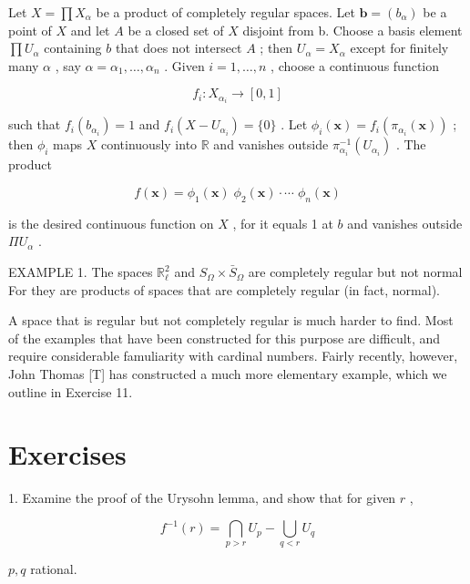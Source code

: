\documentclass[10pt]{article}
\begin{document}
Let \(X = \prod {X}_{\alpha }\) be a product of completely regular spaces. Let \(\mathbf{b} = \left( {b}_{\alpha }\right)\) be a point of \(X\) and let \(A\) be a closed set of \(X\) disjoint from b. Choose a basis element \(\prod {U}_{\alpha }\) containing \(b\) that does not intersect \(A\) ; then \({U}_{\alpha } = {X}_{\alpha }\) except for finitely many \(\alpha\) , say \(\alpha  = {\alpha }_{1},\ldots ,{\alpha }_{n}\) . Given \(i = 1,\ldots ,n\) , choose a continuous function

\[
{f}_{i} : {X}_{{\alpha }_{i}} \rightarrow  \left\lbrack  {0,1}\right\rbrack
\]

such that \({f}_{i}\left( {b}_{{\alpha }_{i}}\right)  = 1\) and \({f}_{i}\left( {X - {U}_{{\alpha }_{i}}}\right)  = \{ 0\}\) . Let \({\phi }_{i}\left( \mathbf{x}\right)  = {f}_{i}\left( {{\pi }_{{\alpha }_{i}}\left( \mathbf{x}\right) }\right)\) ; then \({\phi }_{i}\) maps \(X\) continuously into \(\mathbb{R}\) and vanishes outside \({\pi }_{{\alpha }_{i}}^{-1}\left( {U}_{{\alpha }_{i}}\right)\) . The product

\[
f\left( \mathbf{x}\right)  = {\phi }_{1}\left( \mathbf{x}\right) \;{\phi }_{2}\left( \mathbf{x}\right)  \cdot  \cdots \;{\phi }_{n}\left( \mathbf{x}\right)
\]

is the desired continuous function on \(X\) , for it equals 1 at \(b\) and vanishes outside \(\Pi {U}_{\alpha }\) .

EXAMPLE 1. The spaces \({\mathbb{R}}_{\ell }^{2}\) and \({S}_{\Omega } \times  {\bar{S}}_{\Omega }\) are completely regular but not normal For they are products of spaces that are completely regular (in fact, normal).

A space that is regular but not completely regular is much harder to find. Most of the examples that have been constructed for this purpose are difficult, and require considerable famuliarity with cardinal numbers. Fairly recently, however, John Thomas [T] has constructed a much more elementary example, which we outline in Exercise 11.

\section*{Exercises}

1. Examine the proof of the Urysohn lemma, and show that for given \(r\) ,

\[
{f}^{-1}\left( r\right)  = \mathop{\bigcap }\limits_{{p > r}}{U}_{p} - \mathop{\bigcup }\limits_{{q < r}}{U}_{q}
\]

\(p,q\) rational.
\end{document}
